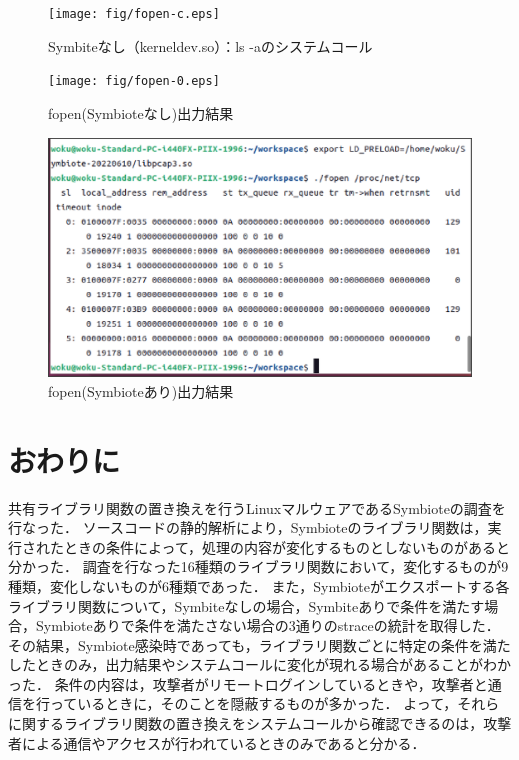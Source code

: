 \documentclass[submit,techreq,noauthor]{eco}	%
\begin{document}
\begin{figure}[t]
	\centering
  \texttt{[image: fig/fopen-c.eps]}
	\caption{Symbiteなし（kerneldev.so）：ls -aのシステムコール}
	\label{fig:fopen0}
\end{figure}

\begin{figure}[t]
	\centering
  \texttt{[image: fig/fopen-0.eps]}
	\caption{fopen(Symbioteなし)出力結果}
	\label{fig:fopen0}
\end{figure}

\begin{figure}[t]
	\centering
  \includegraphics[width=12cm]{fig/fopen-1.eps}
	\caption{fopen(Symbioteあり)出力結果}
	\label{fig:fopen1}
\end{figure}

\section{おわりに}
共有ライブラリ関数の置き換えを行うLinuxマルウェアであるSymbioteの調査を行なった．
ソースコードの静的解析により，Symbioteのライブラリ関数は，実行されたときの条件によって，処理の内容が変化するものとしないものがあると分かった．
調査を行なった16種類のライブラリ関数において，変化するものが9種類，変化しないものが6種類であった．
また，Symbioteがエクスポートする各ライブラリ関数について，Symbiteなしの場合，Symbiteありで条件を満たす場合，Symbioteありで条件を満たさない場合の3通りのstraceの統計を取得した．
その結果，Symbiote感染時であっても，ライブラリ関数ごとに特定の条件を満たしたときのみ，出力結果やシステムコールに変化が現れる場合があることがわかった．
条件の内容は，攻撃者がリモートログインしているときや，攻撃者と通信を行っているときに，そのことを隠蔽するものが多かった．
よって，それらに関するライブラリ関数の置き換えをシステムコールから確認できるのは，攻撃者による通信やアクセスが行われているときのみであると分かる．

\setlength\baselineskip{12pt}
{\small
	
	
}
\end{document}

